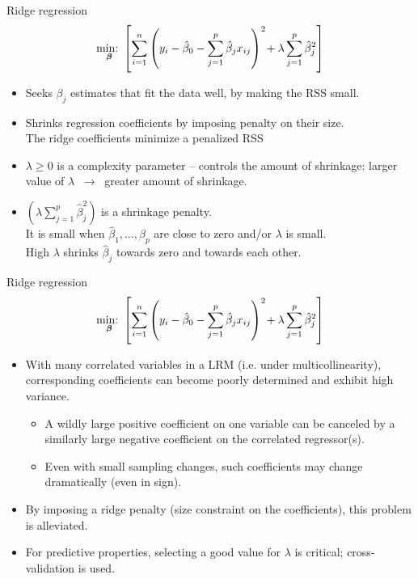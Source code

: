 \documentclass{beamer}
\begin{document}
\begin{frame}{Ridge regression}
$$\underset{\bm{\beta}}{\textnormal{min:~}}
\left[ \sum_{i=1}^n \left(y_i - \hat{\beta}_0 
- \sum_{j=1}^p  \hat{\beta}_j x_{ij} \right)^2 
\! + \lambda \sum_{j=1}^p  \hat{\beta}_j^2 \right]
$$
\begin{itemize}
\item Seeks $\beta_j$ estimates that fit the data well, by making the RSS small.
\smallskip
\item Shrinks regression coefficients by imposing penalty on their size. \\The ridge coefficients minimize a penalized RSS
\smallskip
\item $\lambda \geq 0$ is a complexity parameter -- controls the amount of shrinkage:
larger value of $\lambda$ $~\rightarrow~$ greater amount of shrinkage.
\smallskip
\item $(\lambda \sum_{j=1}^p  \hat{\beta}_j^2)$ is a shrinkage penalty.\\It is small when $\hat{\beta}_1, \dots, \hat{\beta}_p$ are close to zero and/or $\lambda$ is small. \\High $\lambda$ shrinks $\hat{\beta}_j$ towards zero and towards each other.
\end{itemize}
\end{frame}
\begin{frame}{Ridge regression}
$$\underset{\bm{\beta}}{\textnormal{min:~}} 
\left[ \sum_{i=1}^n \left(y_i - \hat{\beta}_0 
- \sum_{j=1}^p  \hat{\beta}_j x_{ij} \right)^2 
\! + \lambda \sum_{j=1}^p  \hat{\beta}_j^2 \right]
$$
\begin{itemize}
\item With many correlated variables in a LRM (i.e. under multicollinearity),
corresponding coefficients can become poorly determined and exhibit high variance.
\begin{itemize}
    \item A wildly large positive coefficient on one variable can be canceled by a
similarly large negative coefficient on the correlated regressor(s).
    \item Even with small sampling changes, such coefficients may change dramatically (even in sign).
\end{itemize}
\item By imposing a ridge penalty (size constraint on the coefficients), this problem is alleviated.
\smallskip
\item For predictive properties, selecting a good value for $\lambda$ is critical; cross-validation is used.
\end{itemize}
\end{frame}
\end{document}
